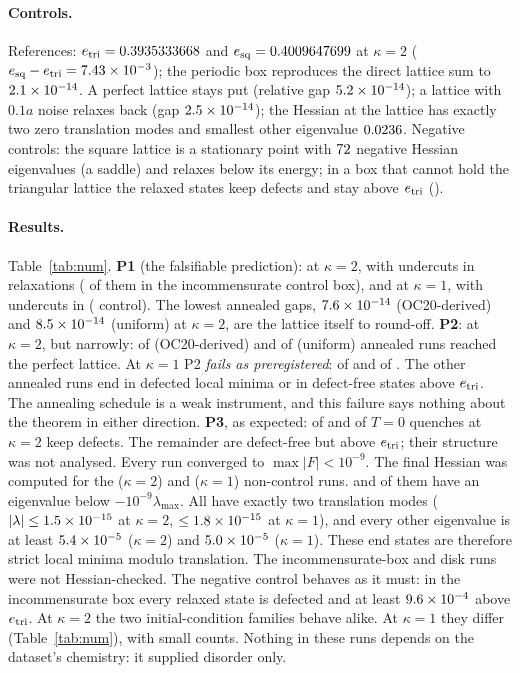 \documentclass[11pt]{article}
\begin{document}
\paragraph{Controls.} References: $e_{\rm tri}=0.3935333668$ and $e_{\rm sq}=0.4009647699$ at $\kappa=2$
($e_{\rm sq}-e_{\rm tri}=7.43\times10^{-3}$); the periodic box reproduces the direct lattice sum to $2.1\times10^{-14}$. A perfect
lattice stays put (relative gap $5.2\times10^{-14}$); a lattice with $0.1a$ noise relaxes back (gap $2.5\times10^{-14}$); the Hessian at
the lattice has exactly two zero translation modes and smallest other eigenvalue $0.0236$. Negative controls: the
square lattice is a stationary point with $72$ negative Hessian eigenvalues (a saddle) and relaxes below its energy;
in a box that cannot hold the triangular lattice the relaxed states keep defects and stay above $e_{\rm tri}$
(\IncommTwo).

\paragraph{Results.} Table~\ref{tab:num}. \textbf{P1} (the falsifiable prediction): \POneTwo{} at $\kappa=2$, with
\UndercutsTwo{} undercuts in \RelaxTwo{} relaxations (\RelaxCtlTwo{} of them in the incommensurate control box), and
\POneOne{} at $\kappa=1$, with \UndercutsOne{} undercuts in \RelaxOne{} (\RelaxCtlOne{} control). The lowest annealed gaps, $7.6\times10^{-14}$ (OC20-derived) and $8.5\times10^{-14}$ (uniform) at $\kappa=2$, are the
lattice itself to round-off. \textbf{P2}: \PTwoTwo{} at $\kappa=2$, but narrowly: \PerfTwoHF{} of \RunsTwoHF{}
(OC20-derived) and \PerfTwoUni{} of \RunsTwoUni{} (uniform) annealed runs reached the perfect lattice. At $\kappa=1$
P2 \emph{fails as preregistered}: \PerfOneHF{} of \RunsOneHF{} and \PerfOneUni{} of \RunsOneUni{}. The other annealed
runs end in defected local minima or in defect-free states above $e_{\rm tri}$. The annealing schedule is a weak
instrument, and this failure says nothing about the theorem in either direction. \textbf{P3}, as expected: \QDefTwoHF{}
of \RunsTwoHF{} and \QDefTwoUni{} of \RunsTwoUni{} $T=0$ quenches at $\kappa=2$ keep defects. The remainder are
defect-free but above $e_{\rm tri}$; their structure was not analysed. Every run converged to $\max|F|<10^{-9}$. The
final Hessian was computed for the \HessCheckedTwo{} ($\kappa=2$) and \HessCheckedOne{} ($\kappa=1$) non-control runs.
\HessNegTwo{} and \HessNegOne{} of them have an eigenvalue below $-10^{-9}\lambda_{\max}$. All have exactly two
translation modes ($|\lambda|\le1.5\times10^{-15}$ at $\kappa=2$, $\le1.8\times10^{-15}$ at $\kappa=1$), and every
other eigenvalue is at least $5.4\times10^{-5}$ ($\kappa=2$) and $5.0\times10^{-5}$ ($\kappa=1$). These end states are
therefore strict local minima modulo translation. The incommensurate-box and disk runs were not Hessian-checked. The
negative control behaves as it must: in the incommensurate box every relaxed state is defected and at least
$9.6\times10^{-4}$ above $e_{\rm tri}$. At $\kappa=2$ the two initial-condition families behave alike. At $\kappa=1$
they differ (Table~\ref{tab:num}), with small counts. Nothing in these runs depends on the dataset's chemistry: it
supplied disorder only.
\end{document}
